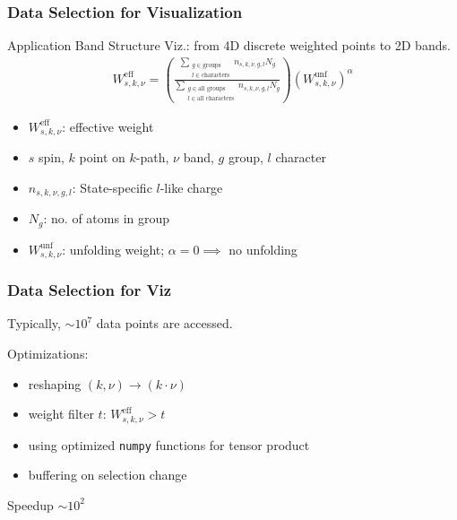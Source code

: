 \begin{frame}\frametitle{Data Selection for Visualization}    
    Application Band Structure Viz.: from 4D discrete weighted points to 2D bands.
    \begin{align*}
      W^{\text{eff}}_{s,k,\nu} = \left( \frac{\sum\limits_{\substack{g \in \text{groups} \\ l \in \text{characters}}} n_{s,k,\nu,g,l} N_g}{\sum\limits_{\substack{g \in \text{all groups} \\ l \in \text{all characters}}} n_{s,k,\nu,g,l} N_g} \right) \left(W_{s,k,\nu}^{\text{unf}}\right)^\alpha
    \end{align*}
    \vspace{1em}
    \begin{itemize}
    \item<2-> \(W^{\text{eff}}_{s,k,\nu}\): effective weight
    \item<3-> \(s\) spin, \(k\) point on \(k\)-path, \(\nu\) band, \(g\)
        group, \(l\) character
    \item<4-> \(n_{s,k,\nu,g,l}\): State-specific \(l\)-like charge
    \item<5-> \(N_g\): no. of atoms in group         
    \item<6-> \(W_{s,k,\nu}^{\text{unf}}\): unfolding weight; \(\alpha =0\implies \) no unfolding
    \end{itemize}

    
\end{frame}
% 

\begin{frame}
    \frametitle{Data Selection for Viz}
    Typically, \(\sim 10^7\) data points are accessed.
    \pause
    \vspace{2em}
     
    Optimizations:
    \pause
    \begin{itemize}
    \item reshaping \((k,\nu) \rightarrow (k \cdot \nu)\)
        \pause
    \item weight filter \(t\): \(W^{\text{eff}}_{s,k,\nu} > t\)
        \pause
    \item using optimized \texttt{numpy} functions for tensor product
        \pause
    \item buffering on selection change
    \end{itemize}
    \pause 
    \faArrowRight{} Speedup \(\sim 10^2\)
\end{frame}

